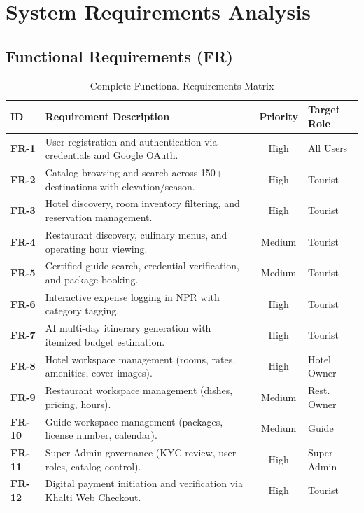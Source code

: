 \documentclass[12pt,a4paper]{report}
\begin{document}
\section{System Requirements Analysis}

\subsection{Functional Requirements (FR)}
\begin{table}[htbp]
\centering
\small
\caption{Complete Functional Requirements Matrix}
\label{tab:fr_complete}
\begin{tabularx}{\textwidth}{l X c l}
\toprule
\textbf{ID} & \textbf{Requirement Description} & \textbf{Priority} & \textbf{Target Role} \\
\midrule
\textbf{FR-1} & User registration and authentication via credentials and Google OAuth. & High & All Users \\
\textbf{FR-2} & Catalog browsing and search across 150+ destinations with elevation/season. & High & Tourist \\
\textbf{FR-3} & Hotel discovery, room inventory filtering, and reservation management. & High & Tourist \\
\textbf{FR-4} & Restaurant discovery, culinary menus, and operating hour viewing. & Medium & Tourist \\
\textbf{FR-5} & Certified guide search, credential verification, and package booking. & Medium & Tourist \\
\textbf{FR-6} & Interactive expense logging in NPR with category tagging. & High & Tourist \\
\textbf{FR-7} & AI multi-day itinerary generation with itemized budget estimation. & High & Tourist \\
\textbf{FR-8} & Hotel workspace management (rooms, rates, amenities, cover images). & High & Hotel Owner \\
\textbf{FR-9} & Restaurant workspace management (dishes, pricing, hours). & Medium & Rest. Owner \\
\textbf{FR-10} & Guide workspace management (packages, license number, calendar). & Medium & Guide \\
\textbf{FR-11} & Super Admin governance (KYC review, user roles, catalog control). & High & Super Admin \\
\textbf{FR-12} & Digital payment initiation and verification via Khalti Web Checkout. & High & Tourist \\
\bottomrule
\end{tabularx}
\end{table}
\end{document}

